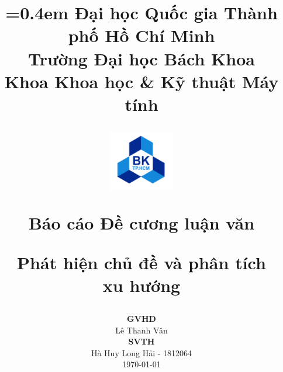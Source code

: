 \title{
	{\parskip=0.4em\normalsize
			Đại học Quốc gia Thành phố Hồ Chí Minh\\
			Trường Đại học Bách Khoa\\
			Khoa Khoa học \& Kỹ thuật Máy tính\\
		}
	\vspace{0.5cm}
	\begin{figure}[!ht]
		\centering
		\includegraphics[width=0.26\textwidth]{img/logo/LogoBKChinhThuc.png}
	\end{figure}
	\vspace{0.1cm}
	\Large {Báo cáo Đề cương luận văn} \\
	\vspace{0.3cm}

	\Huge {\renewcommand{\baselinestretch}{0.1}
		Phát hiện chủ đề và phân tích\\[-0.2em]xu hướng}

	\vspace{0.3cm}
}
\author{}



\date{
	\textbf{\large GVHD}\\[0.3em]
	Lê Thanh Vân\\[2em]
	\textbf{\large SVTH}\\[0.3em]
	Hà Huy Long Hải - 1812064\\
	\vspace{4cm}
	\normalsize{\today}
}

\maketitle
\thispagestyle{empty}
